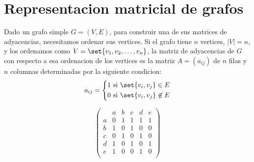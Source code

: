 \section{Representacion matricial de grafos}
Dado un grafo simple \(G = (V,E )\), para construir una de sus matrices de adyacencias, necesitamos ordenar sus vertices. Si el grafo tiene \(n \) vertices, \(|V| = n \), y los ordenamos como \(V = \set{v_{1},v_2,\ldots,v_n }\), la matriz de adyacencias de \(G \) con respecto a esa ordenacion de los vertices es la matriz \(A = (a_{ij })\) de \(n \) filas y \(n \) columnas determinadas por la siguiente condicion:
\[
	a_{ij} = \begin{dcases}
		1 \text{ si } \set{v_i,v_j} \in E \\
		0 \text{ si } \set{v_i,v_j}  \not\in E
	\end{dcases}
\]
\begin{minipage}{0.6\textwidth}
\end{minipage}
\begin{minipage}{0.4\textwidth}
	\[
		\begin{pmatrix}
			  & a & b & c & d & e \\
			a & 0 & 1 & 1 & 1 & 1 \\
			b & 1 & 0 & 1 & 0 & 0 \\
			c & 0 & 1 & 0 & 1 & 0 \\
			d & 1 & 0 & 1 & 0 & 1 \\
			e & 1 & 0 & 0 & 1 & 0 \\
		\end{pmatrix}
	\]
\end{minipage}

